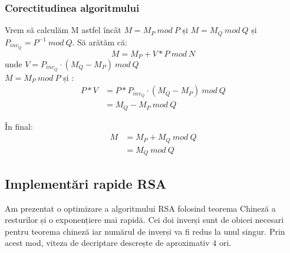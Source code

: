 \documentclass[12]{report}
\begin{document}
	  \subsubsection{Corectitudinea algoritmului}
	  Vrem să calculăm M astfel încât $M =M_P \ mod \ P$ și $M=M_Q \ mod \ Q$ și $P_{inv_Q}=P^{-1} \ mod \ Q$. Să arătăm că: \\
	  $$ M=M_P + V*P \ mod \ N$$
	  unde $ V=P_{inv_Q} \cdot   (M_Q-M_P) \ mod \ Q$ \\
	  $M = M_P \ mod \ P$ și : \\
	  \begin{align*}
	  P*V&= P* P_{inv_Q} \cdot   (M_Q - M_P) \ mod \ Q \\
	   &= M_Q - M_P \ mod \ Q
	  \end{align*}
	  
	  În final: \\
	  \begin{align*}
	   M&= M_P + M_Q \ mod \ Q \\
	   &= M_Q \ mod \ Q 
	  \end{align*}
	  
	  
	  \subsection{Implementări rapide RSA}
	  Am prezentat o optimizare a algoritmului RSA folosind teorema Chineză a resturilor și o exponențiere mai rapidă. Cei doi inverși sunt de obicei necesari pentru teorema chineză iar numărul de inverși va fi redus la unul singur. Prin acest mod, viteza de decriptare descrește de aproximativ $4$ ori.
\end{document}
